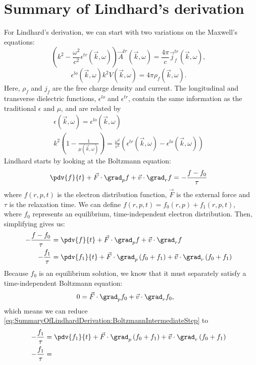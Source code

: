 \documentclass[../../main.tex]{subfiles}
\begin{document}
\newcommand{\frk}{k}
\newcommand{\frargs}{(\vec{\frk}, \omega)}

\section{Summary of Lindhard's derivation}

For Lindhard's derivation, we can start with two variations on the Maxwell's equations:
\begin{equation}
	\left(\frk^2 - \frac{\omega^2}{c^2} \epsilon^{tr}\frargs\right) \vec{A}^{tr}\frargs = \frac{4\pi}{c} \vec{j}^{tr}_{f}\frargs,
\end{equation}
\begin{equation}
	\epsilon^{lo}\frargs \frk^2 V\frargs = 4 \pi \rho_f\frargs.
\end{equation}
Here, $\rho_f$ and $j_f$ are the free charge density and current. The longitudinal and transverse dielectric functions, $\epsilon^{lo}$ and $\epsilon^{tr}$, contain the same information as the traditional $\epsilon$ and $\mu$, and are related by
\begin{gather}
	\epsilon\frargs = \epsilon^{lo}\frargs \\
	\frk^2 \left(1 - \frac{1}{\mu\frargs}\right) = \frac{\omega^2}{c^2} \left(\epsilon^{tr}\frargs - \epsilon^{lo}\frargs\right)
\end{gather}
Lindhard starts by looking at the Boltzmann equation:
\begin{equation} \label{eq:SummaryOfLindhardDerivation:BoltzmannEquation}
	\pdv{f}{t} + \vec{F} \cdot \grad_{p} f + \vec{v} \cdot \grad_{r} f = -\frac{f - f_0}{\tau}
\end{equation}
where $f(r, p, t)$ is the electron distribution function, $\vec{F}$ is the external force and $\tau$ is the relaxation time. We can define $f(r, p, t) = f_0(r, p) + f_1(r, p, t)$, where $f_0$ represents an equilibrium, time-independent electron distribution. Then, simplifying gives us:
\begin{align}
	-\frac{f - f_0}{\tau} &= \pdv{f}{t} + \vec{F} \cdot \grad_{p} f + \vec{v} \cdot \grad_{r} f \\
	-\frac{f_1}{\tau} &= \pdv{f_1}{t} + \vec{F} \cdot \grad_{p} \left(f_0 + f_1\right) + \vec{v} \cdot \grad_{r} \left(f_0 + f_1\right) \label{eq:SummaryOfLindhardDerivation:BoltzmannIntermediateStep}
\end{align}
Because $f_0$ is an equilibrium solution, we know that it must separately satisfy a time-independent Boltzmann equation:
\begin{align}
	0 &= \vec{F} \cdot \grad_{p} f_0 + \vec{v}\cdot \grad_{r} f_0,
\end{align}
which means we can reduce \eqref{eq:SummaryOfLindhardDerivation:BoltzmannIntermediateStep} to
\begin{align}
	-\frac{f_1}{\tau} &= \pdv{f_1}{t} + \vec{F} \cdot \grad_{p} \left(f_0 + f_1\right) + \vec{v} \cdot \grad_{r} \left(f_0 + f_1\right) \\
	-\frac{f_1}{\tau} &= 
\end{align}
\end{document}
